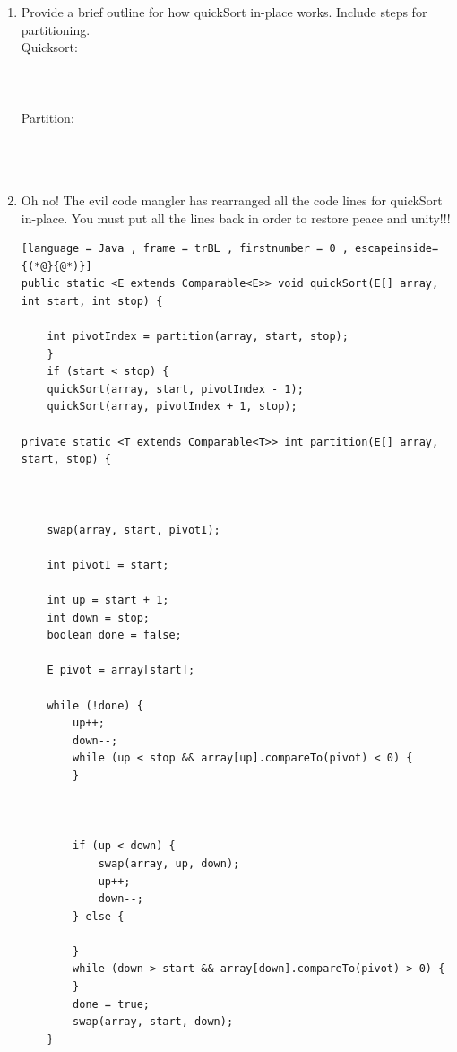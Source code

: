 \documentclass[letter]{article}
\begin{document}
\begin{enumerate}[1.]
    \item Provide a brief outline for how quickSort in-place works. Include steps for partitioning.\\

    Quicksort:\\\\\\\\

    


    Partition:\\\\\\\\

    


    \newpage

    \item Oh no! The evil code mangler has rearranged all the code lines for quickSort in-place. You must put all the lines back in order to restore peace and unity!!!\\

    \begin{lstlisting}[language = Java , frame = trBL , firstnumber = 0 , escapeinside={(*@}{@*)}]
public static <E extends Comparable<E>> void quickSort(E[] array, int start, int stop) {
    
    int pivotIndex = partition(array, start, stop);  
    }
    if (start < stop) {
    quickSort(array, start, pivotIndex - 1);
    quickSort(array, pivotIndex + 1, stop);

private static <T extends Comparable<T>> int partition(E[] array, start, stop) {
    

    
    swap(array, start, pivotI);

    int pivotI = start;

    int up = start + 1;
    int down = stop;
    boolean done = false;

    E pivot = array[start];

    while (!done) {
        up++;
        down--;
        while (up < stop && array[up].compareTo(pivot) < 0) {
        }
    
        

        if (up < down) {
            swap(array, up, down);
            up++;
            down--;
        } else {
            
        }
        while (down > start && array[down].compareTo(pivot) > 0) {
        }
        done = true;
        swap(array, start, down);
    }
    

\end{lstlisting}
\end{enumerate}
\end{document}
